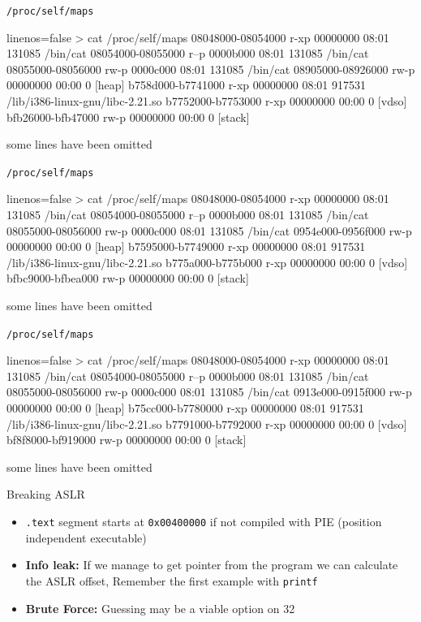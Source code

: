 \documentclass[beamer]{uibk}
\begin{document}
\begin{frame}[fragile]{\texttt{/proc/self/maps}}
    \begin{code*}{linenos=false}
        > cat /proc/self/maps
        08048000-08054000 r-xp 00000000 08:01 131085     /bin/cat
        08054000-08055000 r--p 0000b000 08:01 131085     /bin/cat
        08055000-08056000 rw-p 0000c000 08:01 131085     /bin/cat
        08905000-08926000 rw-p 00000000 00:00 0          [heap]
        b758d000-b7741000 r-xp 00000000 08:01 917531     /lib/i386-linux-gnu/libc-2.21.so
        b7752000-b7753000 r-xp 00000000 00:00 0          [vdso]
        bfb26000-bfb47000 rw-p 00000000 00:00 0          [stack]
    \end{code*}
    \bigskip
    some lines have been omitted
\end{frame}
\begin{frame}[fragile]{\texttt{/proc/self/maps}}
    \begin{code*}{linenos=false}
        > cat /proc/self/maps
        08048000-08054000 r-xp 00000000 08:01 131085     /bin/cat
        08054000-08055000 r--p 0000b000 08:01 131085     /bin/cat
        08055000-08056000 rw-p 0000c000 08:01 131085     /bin/cat
        0954e000-0956f000 rw-p 00000000 00:00 0          [heap]
        b7595000-b7749000 r-xp 00000000 08:01 917531     /lib/i386-linux-gnu/libc-2.21.so
        b775a000-b775b000 r-xp 00000000 00:00 0          [vdso]
        bfbc9000-bfbea000 rw-p 00000000 00:00 0          [stack]
    \end{code*}
    \bigskip
    some lines have been omitted
\end{frame}
\begin{frame}[fragile]{\texttt{/proc/self/maps}}
    \begin{code*}{linenos=false}
        > cat /proc/self/maps
        08048000-08054000 r-xp 00000000 08:01 131085     /bin/cat
        08054000-08055000 r--p 0000b000 08:01 131085     /bin/cat
        08055000-08056000 rw-p 0000c000 08:01 131085     /bin/cat
        0913e000-0915f000 rw-p 00000000 00:00 0          [heap]
        b75cc000-b7780000 r-xp 00000000 08:01 917531     /lib/i386-linux-gnu/libc-2.21.so
        b7791000-b7792000 r-xp 00000000 00:00 0          [vdso]
        bf8f8000-bf919000 rw-p 00000000 00:00 0          [stack]
    \end{code*}
    \bigskip
    some lines have been omitted
\end{frame}

\begin{frame}{Breaking ASLR}
    \begin{itemize}
        \item \texttt{.text} segment starts at \texttt{0x00400000} if not
            compiled with PIE (position independent executable)
        \medskip
        \pause
        \item \textbf{Info leak:} If we manage to get pointer from the program
            we can calculate the ASLR offset, Remember the first example with
            \texttt{printf}
        \medskip
        \item \textbf{Brute Force:} Guessing may be a viable option on
            \SI{32}{\bit}
    \end{itemize}
\end{frame}
\end{document}
